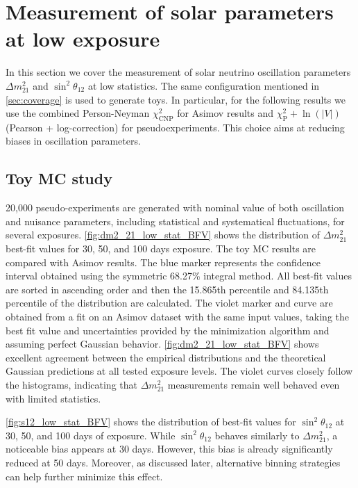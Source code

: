 \clearpage
\section{Measurement of solar parameters at low exposure}\label{sec:solar_params}
In this section we cover the measurement of solar neutrino oscillation parameters $\Delta m^2_{21}$ and $\sin^2\theta_{12}$ at low statistics. 
The same configuration mentioned in \autoref{sec:coverage} is used to generate toys. In particular, for the following results we use the combined Person-Neyman $\chi^2_{\mathrm{CNP}}$ for Asimov results and $\chi^2_{\mathrm{P}}+\ln(|V|)$  (Pearson + log-correction) for pseudoexperiments. This choice aims at reducing biases in oscillation parameters.

\subsection{Toy MC study}
20,000 pseudo-experiments are generated with nominal value of both oscillation and nuisance parameters, including statistical and systematical fluctuations, for several exposures. 
\autoref{fig:dm2_21_low_stat_BFV} shows the distribution of $\Delta m^2_{21}$ best-fit values for 30, 50, and 100 days exposure. The toy MC results are compared with Asimov results. The blue marker represents the confidence interval obtained using the symmetric 68.27\% integral method. All best-fit values are sorted in ascending order and then the 15.865th percentile and 84.135th percentile of the distribution are calculated. The violet marker and curve are obtained from a fit on an Asimov dataset with the same input values, taking the best fit value and uncertainties provided by the minimization algorithm and assuming perfect Gaussian behavior. 
\autoref{fig:dm2_21_low_stat_BFV} shows excellent agreement between the empirical distributions and the theoretical Gaussian predictions at all tested exposure levels. The violet curves closely follow the histograms, indicating that $\Delta m^2_{21}$ measurements remain well behaved even with limited statistics.

\autoref{fig:s12_low_stat_BFV} shows the distribution of best-fit values for $\sin^2 \theta_{12}$ at 30, 50, and 100 days of exposure. While $\sin^2 \theta_{12}$ behaves similarly to $\Delta m^2_{21}$, a noticeable bias appears at 30 days. However, this bias is already significantly reduced at 50 days. Moreover, as discussed later, alternative binning strategies can help further minimize this effect.

